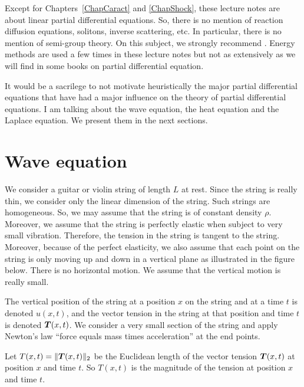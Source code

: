 Except for Chapters~\ref{ChapCaract} and \ref{ChapShock}, these
lecture notes are about linear partial differential equations.  So,
there is no mention of reaction diffusion equations, solitons, inverse
scattering, etc.  In particular, there is no mention of semi-group
theory.  On this subject, we strongly recommend \cite{He}.  Energy
methods are used a few times in these lecture notes but not as
extensively as we will find in some books on partial differential
equation.

It would be a sacrilege to not motivate heuristically the major partial
differential equations that have had a major influence on the theory
of partial differential equations.  I am talking about the wave
equation, the heat equation and the Laplace equation.  We present them
in the next sections.

\section*{Wave equation}

We consider a guitar or violin string of length $L$ at rest.  Since
the string is really thin, we consider only the linear dimension of
the string.  Such strings are homogeneous.  So, we may assume that the
string is of constant density $\rho$.
Moreover, we assume that the string is perfectly elastic when
subject to very small vibration.  Therefore, the tension in the string
is tangent to the string.   Moreover, because of the perfect
elasticity, we also assume that each point on the string is only moving
up and down in a vertical plane as illustrated in the figure below.
There is no horizontal motion.  We assume that the vertical motion is
really small.


The vertical position of the string at a position $x$ on the string
and at a time $t$ is denoted $u(x,t)$, and the vector tension in the string
at that position and time $t$ is denoted ${\bm{T}}(x,t)$.  We consider a
very small section of the string and apply Newton's law
``force equals mass times acceleration'' at the end points.   

Let $T(x,t) = \|{\bm{T}}(x,t)\|_2$ be the Euclidean length of the
vector tension ${\bm{T}}(x,t)$ at position $x$ and time $t$.  So
$T(x,t)$ is the magnitude of the tension at position $x$ and time $t$.



